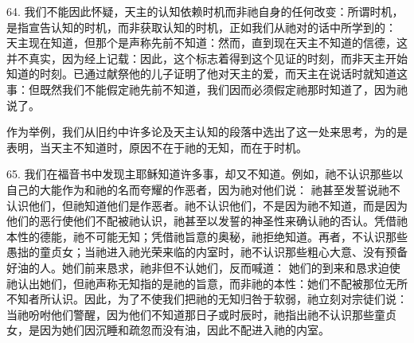 64. 我们不能因此怀疑，天主的认知依赖时机而非祂自身的任何改变：所谓时机，是指宣告认知的时机，而非获取认知的时机，正如我们从祂对的话中所学到的： 天主现在知道，但那个是声称先前不知道：然而，直到现在天主不知道的信德，这并不真实，因为经上记载：因此，这个标志着得到这个见证的时刻，而非天主开始知道的时刻。已通过献祭他的儿子证明了他对天主的爱，而天主在说话时就知道这事：但既然我们不能假定祂先前不知道，我们因而必须假定祂那时知道了，因为祂说了。\par

作为举例，我们从旧约中许多论及天主认知的段落中选出了这一处来思考，为的是表明，当天主不知道时，原因不在于祂的无知，而在于时机。\par

65. 我们在福音书中发现主耶稣知道许多事，却又不知道。例如，祂不认识那些以自己的大能作为和祂的名而夸耀的作恶者，因为祂对他们说： 祂甚至发誓说祂不认识他们，但祂知道他们是作恶者。祂不认识他们，不是因为祂不知道，而是因为他们的恶行使他们不配被祂认识，祂甚至以发誓的神圣性来确认祂的否认。凭借祂本性的德能，祂不可能无知；凭借祂旨意的奥秘，祂拒绝知道。再者，不认识那些愚拙的童贞女；当祂进入祂光荣来临的内室时，祂不认识那些粗心大意、没有预备好油的人。她们前来恳求，祂非但不认她们，反而喊道： 她们的到来和恳求迫使祂认出她们，但祂声称无知指的是祂的旨意，而非祂的本性：她们不配被那位无所不知者所认识。因此，为了不使我们把祂的无知归咎于软弱，祂立刻对宗徒们说：当祂吩咐他们警醒，因为他们不知道那日子或时辰时，祂指出祂不认识那些童贞女，是因为她们因沉睡和疏忽而没有油，因此不配进入祂的内室。\par

